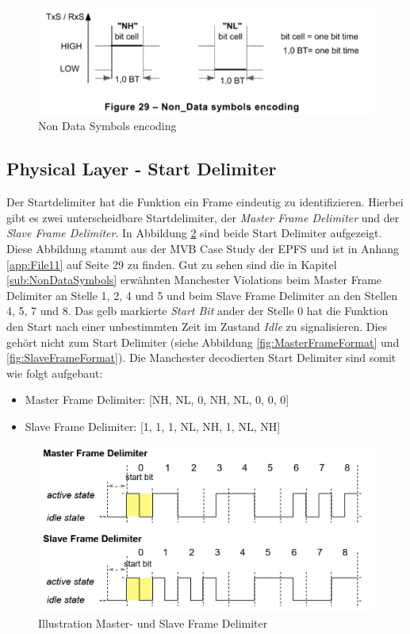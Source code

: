 \begin{figure}[H]
    \centering
    \includegraphics[width = 0.7 \textwidth]{Figures/Chap2/Grundlagen/MVB_DOKU/Layer/Non_Data_Symbol.png}
    \caption{Non Data Symbols encoding}
    \label{fig:NonDataSymbolsEncoding}
\end{figure}

\subsection{Physical Layer - Start Delimiter}
\label{sub:StartDelimiter}
Der Startdelimiter hat die Funktion ein Frame eindeutig zu identifizieren. Hierbei gibt es zwei unterscheidbare Startdelimiter, der \textit{Master Frame Delimiter} und der \textit{Slave Frame Delimiter}. In Abbildung \ref{fig:FrameDelimiterMasterSlave} sind beide Start Delimiter aufgezeigt. Diese Abbildung stammt aus der MVB Case Study der EPFS und ist in Anhang \ref{app:File11} auf Seite 29 zu finden. Gut zu sehen sind die in Kapitel \ref{sub:NonDataSymbols} erwähnten Manchester Violations beim Master Frame Delimiter an Stelle 1, 2, 4 und 5 und beim Slave Frame Delimiter an den Stellen 4, 5, 7 und 8. Das gelb markierte \textit{Start Bit} ander der Stelle 0 hat die Funktion den Start nach einer unbestimmten Zeit im Zustand \textit{Idle} zu signalisieren. Dies gehört nicht zum Start Delimiter (siehe Abbildung \ref{fig:MasterFrameFormat} und \ref{fig:SlaveFrameFormat}). Die Manchester decodierten Start Delimiter sind somit wie folgt aufgebaut:

\begin{itemize}
    \item Master Frame Delimiter: [NH, NL, 0, NH, NL, 0, 0, 0]
    \item Slave Frame Delimiter: [1, 1, 1, NL, NH, 1, NL, NH]
\end{itemize}


\begin{figure}[H]
    \centering
    \includegraphics[width=0.8\linewidth]{Figures/Chap2/Grundlagen/MVB_DOKU/Layer/Frame_Delimiter.png}
    \caption{Illustration Master- und Slave Frame Delimiter}
    \label{fig:FrameDelimiterMasterSlave}
\end{figure}

